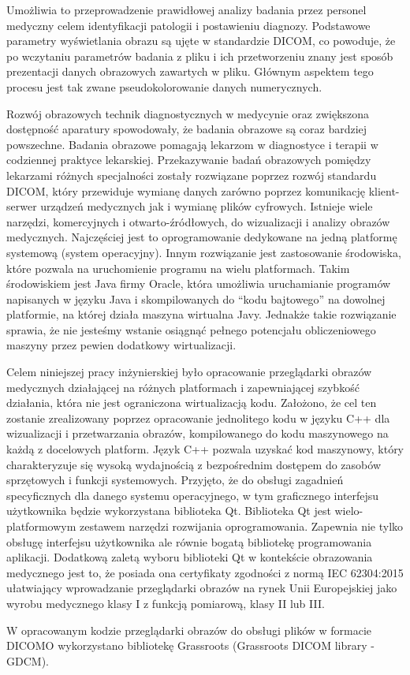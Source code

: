 Umożliwia to przeprowadzenie prawidłowej analizy badania przez personel medyczny celem identyfikacji patologii i postawieniu diagnozy.
Podstawowe parametry wyświetlania obrazu są ujęte w standardzie DICOM, co powoduje, że po wczytaniu parametrów badania z pliku i ich przetworzeniu znany jest sposób prezentacji danych obrazowych zawartych w pliku.
Głównym aspektem tego procesu jest tak zwane pseudokolorowanie danych numerycznych. 
\par
Rozwój obrazowych technik diagnostycznych w medycynie oraz zwiększona dostępność aparatury spowodowały, że badania obrazowe są coraz bardziej powszechne. Badania obrazowe pomagają lekarzom w diagnostyce i terapii w codziennej praktyce lekarskiej.
Przekazywanie badań obrazowych pomiędzy lekarzami różnych specjalności zostały rozwiązane poprzez rozwój standardu DICOM, który przewiduje wymianę danych zarówno poprzez komunikację klient-serwer urządzeń medycznych jak i wymianę plików cyfrowych. 
Istnieje wiele narzędzi, komercyjnych i otwarto-źródłowych, do wizualizacji i analizy obrazów medycznych. Najczęściej jest to oprogramowanie dedykowane na jedną platformę systemową (system operacyjny).  
Innym rozwiązanie jest zastosowanie środowiska, które pozwala na uruchomienie programu na wielu platformach. Takim środowiskiem jest Java firmy Oracle, która umożliwia uruchamianie programów napisanych w języku Java i skompilowanych do \enquote{kodu bajtowego} na dowolnej platformie, na której działa maszyna wirtualna Javy. Jednakże takie rozwiązanie sprawia, że nie jesteśmy wstanie osiągnąć pełnego potencjału obliczeniowego maszyny przez pewien dodatkowy wirtualizacji.
\par
Celem niniejszej pracy inżynierskiej było opracowanie przeglądarki obrazów medycznych działającej na różnych platformach i zapewniającej szybkość działania, która nie jest ograniczona wirtualizacją kodu. Założono, że cel ten zostanie zrealizowany poprzez opracowanie jednolitego kodu w języku C++ dla wizualizacji i przetwarzania obrazów, kompilowanego do kodu maszynowego na każdą z docelowych platform. Język C++ pozwala uzyskać kod maszynowy, który charakteryzuje się wysoką wydajnością z bezpośrednim dostępem do zasobów sprzętowych i funkcji systemowych.
Przyjęto, że do obsługi zagadnień specyficznych dla danego systemu operacyjnego, w tym graficznego interfejsu użytkownika będzie wykorzystana biblioteka Qt. Biblioteka Qt jest wielo-platformowym zestawem narzędzi rozwijania oprogramowania. Zapewnia nie tylko obsługę interfejsu użytkownika ale równie bogatą bibliotekę programowania aplikacji. Dodatkową zaletą wyboru biblioteki Qt w kontekście obrazowania medycznego jest to, że posiada ona certyfikaty zgodności z normą IEC 62304:2015 ułatwiający wprowadzanie przeglądarki obrazów na rynek Unii Europejskiej jako wyrobu medycznego klasy I z funkcją pomiarową, klasy II lub III.  
\par
W opracowanym kodzie przeglądarki obrazów do obsługi plików w formacie DICOMO wykorzystano bibliotekę Grassroots (Grassroots DICOM library - GDCM).


